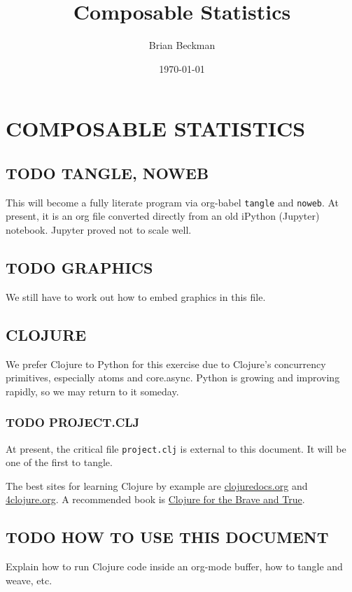\documentclass[10pt,oneside,x11names]{article}
\author{Brian Beckman}
\date{\today}
\title{Composable Statistics}
\begin{document}
\maketitle
\setcounter{tocdepth}{2}
\tableofcontents


\section{COMPOSABLE STATISTICS}
\label{composable-statistics}
\subsection{{\bfseries\sffamily TODO} TANGLE, NOWEB}
\label{sec:org0a0f751}

This will become a fully literate program via org-babel \texttt{tangle} and
\texttt{noweb}. At present, it is an org file converted directly from an old
iPython (Jupyter) notebook. Jupyter proved not to scale well.

\subsection{{\bfseries\sffamily TODO} GRAPHICS}
\label{sec:orge1b5711}

We still
have to work out how to embed graphics in this file.

\subsection{CLOJURE}
\label{clojure}
We prefer Clojure to Python for this exercise due to Clojure's
concurrency primitives, especially atoms and core.async. Python is
growing and improving rapidly, so we may return to it someday.

\subsubsection{{\bfseries\sffamily TODO} PROJECT.CLJ}
\label{sec:orgde79257}

At present, the critical file \texttt{project.clj} is external to this
document. It will be one of the first to tangle.

The best sites for learning Clojure by example are
\href{http://clojuredocs.org}{clojuredocs.org} and
\href{http://4clojure.org}{4clojure.org}. A recommended book is
\href{http://braveclojure.com}{Clojure for the Brave and True}.

\subsection{{\bfseries\sffamily TODO} HOW TO USE THIS DOCUMENT}
\label{how-to-use-this-document}
Explain how to run Clojure code inside an org-mode buffer, how to tangle and
weave, etc.
\end{document}
